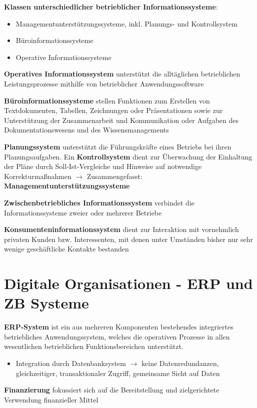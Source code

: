 \textbf{Klassen unterschiedlicher betrieblicher Informationssysteme}:
\begin{itemize}
	\item Managementunterstützungssysteme, inkl. Planungs- und Kontrollsystem
	\item Büroinformationssysteme
	\item Operative Informationssysteme 
\end{itemize}

\textbf{Operatives Informationssystem} unterstützt die alltäglichen betrieblichen Leistungsprozesse mithilfe von
betrieblicher Anwendungssoftware

\textbf{Büroinformationssysteme} stellen Funktionen zum Erstellen von Textdokumenten, Tabellen, Zeichnungen oder Präsentationen sowie zur Unterstützung der Zusammenarbeit und Kommunikation oder Aufgaben des Dokumentationswesens und des Wissensmanagements

\textbf{Planungssystem} unterstützt die Führungskräfte eines Betriebs bei ihren Planungsaufgaben. Ein \textbf{Kontrollsystem} dient zur Überwachung der Einhaltung der Pläne durch Soll-Ist-Vergleiche und Hinweise auf notwendige Korrekturmaßnahmen $\rightarrow$ Zusammengefasst: \textbf{Managementunterstützungssysteme}

\textbf{Zwischenbetriebliches Informationssystem} verbindet die Informationssysteme zweier oder mehrerer Betriebe

\textbf{Konsumenteninformationssystem} dient zur Interaktion mit vornehmlich privaten Kunden bzw.
Interessenten, mit denen unter Umständen bisher nur sehr wenige geschäftliche Kontakte bestanden

\section{Digitale Organisationen - ERP und ZB Systeme}
\textbf{ERP-System} ist ein aus mehreren Komponenten bestehendes integriertes betriebliches Anwendungssystem, welches die operativen Prozesse in allen wesentlichen betrieblichen Funktionsbereichen unterstützt.
\begin{itemize}
	\item Integration durch Datenbanksystem $\rightarrow$ keine Datenredundanzen, gleichzeitiger, transaktionaler Zugriff, gemeinsame Sicht auf Daten
\end{itemize}

\textbf{Finanzierung} fokussiert sich auf die Bereitstellung und zielgerichtete Verwendung finanzieller Mittel

